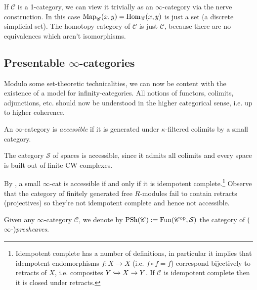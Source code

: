 \documentclass[11pt,openany]{book}
\renewcommand{\Pre}{\mathrm{PSh}}
\begin{document}
\begin{example} If $\mathscr{C}$ is a 1-category, we can view it trivially as an $\infty$-category via the nerve construction. In this case $\mathrm{Map}_\mathscr{C}(x,y) = \mathrm{Hom}_\mathscr{C}(x,y)$ is just a set (a discrete simplicial set). The homotopy category of $\mathscr{C}$ is just $\mathscr{C}$, because there are no equivalences which aren't isomorphisms.
\end{example}


\subsection{Presentable $\infty$-categories}

Modulo some set-theoretic technicalities, we can now be content with the existence of a model for infinity-categories. All notions of functors, colimits, adjunctions, etc. should now be understood in the higher categorical sense, i.e. up to higher coherence.

\begin{definition} \cite[5.4.2.1]{HTT} An $\infty$-category is \textit{accessible} if it is generated under $\kappa$-filtered colimits by a small category.
\end{definition}

\begin{example}\label{ex:spaces-presentable}  The category $\mathcal{S}$ of spaces is accessible, since it admits all colimits and every space is built out of finite CW complexes.
\end{example}

\begin{remark} By \cite[5.4.3.6]{HTT}, a small $\infty$-cat is accessible if and only if it is idempotent complete.\footnote{Idempotent complete has a number of definitions, in particular it implies that idempotent endomorphisms $f \colon X \to X$ (i.e. $f\circ f = f$) correspond bijectively to retracts of $X$, i.e. composites $Y \xhookrightarrow{} X \to Y$. If $\mathscr{C}$ is idempotent complete then it is closed under retracts.} Observe that the category of finitely generated free $R$-modules fail to contain retracts (projectives) so they're not idempotent complete and hence not accessible.
\end{remark}


\begin{definition}\label{def:presheaves}  Given any $\infty$-category $\mathscr{C}$, we denote by $\Pre(\mathscr{C}) := \Fun(\mathscr{C}^\op, \mathcal{S})$ the category of ($\infty$-)\textit{presheaves}.
\end{definition}
\end{document}
